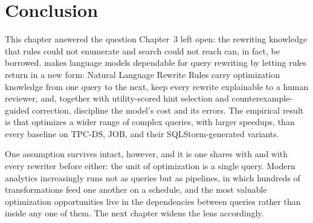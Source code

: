 \vspace{-1mm}

\section{Conclusion}
\label{gen:sec:conclusion}

This chapter answered the question Chapter~3 left open: the rewriting
knowledge that rules could not enumerate and search could not reach
can, in fact, be borrowed. \genrewrite makes language models
dependable for query rewriting by letting rules return in a new form:
Natural Language Rewrite Rules carry optimization knowledge from one
query to the next, keep every rewrite explainable to a human reviewer,
and, together with utility-scored hint selection and
counterexample-guided correction, discipline the model's cost and its
errors. The empirical result is that \genrewrite optimizes a wider
range of complex queries, with larger speedups, than every baseline on
TPC-DS, JOB, and their SQLStorm-generated variants.

One assumption survives intact, however, and it is one \genrewrite
shares with \slabcity and with every rewriter before either: the unit
of optimization is a single query. Modern analytics increasingly runs
not as queries but as pipelines, in which hundreds of transformations
feed one another on a schedule, and the most valuable optimization
opportunities live in the dependencies between queries rather than
inside any one of them. The next chapter widens the lens accordingly.



